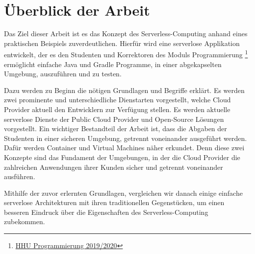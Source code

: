 \section{Überblick der Arbeit}
Das Ziel dieser Arbeit ist es das Konzept des Serverless-Computing anhand eines praktischen
Beispiels zuverdeutlichen. Hierfür wird eine serverlose Applikation entwickelt,
der es den Studenten und Korrektoren des Moduls Programmierung
\footnote{
  \href{
    https://www.cs.hhu.de/de/lehrstuehle-und-arbeitsgruppen/betriebssysteme-prof-dr-michael-schoettner/lehre-und-abschlussarbeiten/fruehere-lehrveranstaltungen/vorlesungen/ws-201920/programmierung.html?C=D\%253BO\%253DA
    }{HHU Programmierung 2019/2020}
} ermöglicht einfache Java und Gradle Programme, in einer abgekapselten Umgebung, auszuführen und zu testen.

Dazu werden zu Beginn die nötigen Grundlagen und Begriffe erklärt. Es werden zwei prominente und
unterschiedliche Dienstarten vorgestellt, welche Cloud Provider aktuell den Entwicklern zur Verfügung stellen.
Es werden aktuelle serverlose Dienste der Public Cloud Provider und Open-Source Lösungen vorgestellt.
Ein wichtiger Bestandteil der Arbeit ist, dass die Abgaben der Studenten in einer sicheren Umgebung,
getrennt voneinander ausgeführt werden. Dafür werden Container und Virtual Machines
näher erkundet. Denn diese zwei Konzepte sind das Fundament der Umgebungen,
in der die Cloud Provider die zahlreichen Anwendungen ihrer Kunden sicher und getrennt voneinander ausführen.

Mithilfe der zuvor erlernten Grundlagen, vergleichen wir danach einige einfache
serverlose Architekturen mit ihren traditionellen Gegenstücken,
um einen besseren Eindruck über die Eigenschaften des Serverless-Computing zubekommen.
